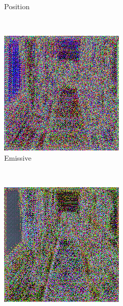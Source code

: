 \begin{figure}[h!]
\begin{subfigure}[b]{0.175\textwidth}
     \caption{Position}
    \end{subfigure}
    \\ \vspace{0.2cm} %
    \begin{subfigure}[b]{0.175\textwidth}
     \includegraphics[width=\textwidth]{figures/result/triple/albedo_normal_emissive/2.png}
     \caption{Emissive}\label{subfig:1}
    \end{subfigure}
    ~
    \begin{subfigure}[b]{0.175\textwidth}
     \includegraphics[width=\textwidth]{figures/result/triple/albedo_normal_metalness/2.png}

\end{subfigure}
\end{figure}
